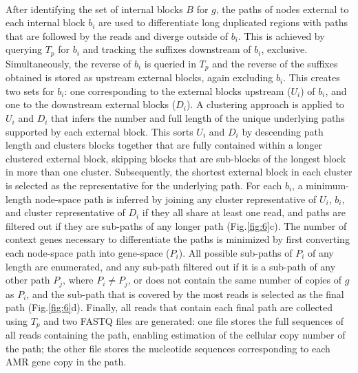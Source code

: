 \paragraph{}
After identifying the set of internal blocks $B$ for $g$, the paths of nodes external to each internal block $b_i$ are used to differentiate long duplicated regions with paths that are followed by the reads and diverge outside of $b_i$. This is achieved by querying $T_p$ for $b_i$ and tracking the suffixes downstream of $b_i$, exclusive. Simultaneously, the reverse of $b_i$ is queried in $T_p$ and the reverse of the suffixes obtained is stored as upstream external blocks, again excluding $b_i$. This creates two sets for $b_i$: one corresponding to the external blocks upstream ($U_i$) of $b_i$, and one to the downstream external blocks ($D_i$). A clustering approach is applied to $U_i$ and $D_i$ that infers the number and full length of the unique underlying paths supported by each external block. This sorts $U_i$ and $D_i$ by descending path length and clusters blocks together that are fully contained within a longer clustered external block, skipping blocks that are sub-blocks of the longest block in more than one cluster. Subsequently, the shortest external block in each cluster is selected as the representative for the underlying path. For each $b_i$, a minimum-length node-space path is inferred by joining any cluster representative of $U_i$, $b_i$, and cluster representative of $D_i$ if they all share at least one read, and paths are filtered out if they are sub-paths of any longer path (Fig.\ref{fig:6}c). The number of context genes necessary to differentiate the paths is minimized by first converting each node-space path into gene-space ($P_i$). All possible sub-paths of $P_i$ of any length are enumerated, and any sub-path filtered out if it is a sub-path of any other path $P_j$, where $P_i \neq P_j$, or does not contain the same number of copies of $g$ as $P_i$, and the sub-path that is covered by the most reads is selected as the final path (Fig.\ref{fig:6}d). Finally, all reads that contain each final path are collected using $T_p$ and two FASTQ files are generated: one file stores the full sequences of all reads containing the path, enabling estimation of the cellular copy number of the path; the other file stores the nucleotide sequences corresponding to each AMR gene copy in the path.

